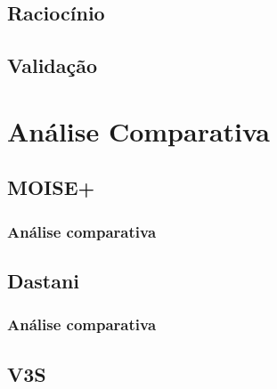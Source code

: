 \documentclass[openright]{normas-utf-tex} %
\begin{document}
			

	\section{Raciocínio}

			
	
	\section{Validação}

			

\chapter{Análise Comparativa}

	

	\section{MOISE+}
	
		
	
		\subsection{Análise comparativa}

			

	\section{Dastani}

		

		\subsection{Análise comparativa}

			

	\section{V3S}

		
\end{document}
